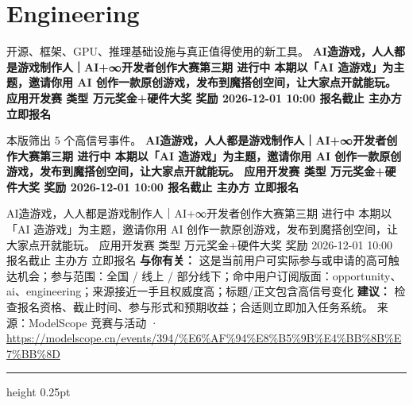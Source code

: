 \documentclass[10.5pt]{ctexart}
\begin{document}
\section*{Engineering}
{\color{ormuted} 开源、框架、GPU、推理基础设施与真正值得使用的新工具。}
\vspace{2mm}
{\LARGE\bfseries AI造游戏，人人都是游戏制作人｜AI+∞开发者创作大赛第三期 进行中 本期以「AI 造游戏」为主题，邀请你用 AI 创作一款原创游戏，发布到魔搭创空间，让大家点开就能玩。 应用开发赛 类型 万元奖金+硬件大奖 奖励 2026-12-01 10:00 报名截止 主办方 立即报名}\par
\vspace{1mm}
{\color{ormuted} 本版筛出 5 个高信号事件。}
\vspace{3mm}
{\Large\bfseries AI造游戏，人人都是游戏制作人｜AI+∞开发者创作大赛第三期 进行中 本期以「AI 造游戏」为主题，邀请你用 AI 创作一款原创游戏，发布到魔搭创空间，让大家点开就能玩。 应用开发赛 类型 万元奖金+硬件大奖 奖励 2026-12-01 10:00 报名截止 主办方 立即报名}\par
AI造游戏，人人都是游戏制作人｜AI+∞开发者创作大赛第三期 进行中 本期以「AI 造游戏」为主题，邀请你用 AI 创作一款原创游戏，发布到魔搭创空间，让大家点开就能玩。 应用开发赛 类型 万元奖金+硬件大奖 奖励 2026-12-01 10:00 报名截止 主办方 立即报名
\textbf{与你有关：} 这是当前用户可实际参与或申请的高可触达机会；参与范围：全国 / 线上 / 部分线下；命中用户订阅版面：opportunity、ai、engineering；来源接近一手且权威度高；标题/正文包含高信号变化
\textbf{建议：} 检查报名资格、截止时间、参与形式和预期收益；合适则立即加入任务系统。
{\footnotesize\color{ormuted} 来源：ModelScope 竞赛与活动 · \url{https://modelscope.cn/events/394/%E6%AF%94%E8%B5%9B%E4%BB%8B%E7%BB%8D}}
\vspace{4mm}
\hrule height 0.25pt
\vspace{3mm}
\end{document}
